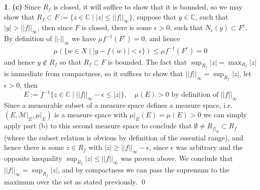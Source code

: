 \documentclass[11pt]{article}
\theoremstyle{definition}
\newtheorem{pb}{}
\newcommand{\set}[1]{\{#1\}}
\newcommand{\abs}[1]{\left\vert#1\right\vert}
\newcommand{\norm}[1]{\lvert\lvert#1\rvert\rvert}
\begin{document}
\begin{pb}
        \textbf{(c)} Since \(R_f\) is closed, it will suffice to show that it is bounded, so we may show that \(R_f \subset F := \set{z \in \mathbb{C} \mid \abs{z} \leq \norm{f}_\infty}\), suppose that \(y \in \mathbb{C}\), such that \(\abs{y} > \norm{f}_\infty\), then since \(F\) is closed, there is some \(\epsilon > 0\), such that \(N_\epsilon(y) \subset F^c\). By definition of \(\norm{\cdot}_\infty\) we have \(\mu f^{-1}(F^c) = 0\), and hence
        \begin{align*}
            \mu(\set{w \in X \mid \abs{y - f(w)} < \epsilon}) \leq \mu f^{-1}(F^c) = 0
        \end{align*}
        and hence \(y \not \in R_f\) so that \(R_f \subset F\) is bounded. The fact that \(\sup_{R_f}\abs{z} = \max_{R_f}\abs{z}\) is immediate from compactness, so it suffices to show that \(\norm{f}_\infty = \sup_{R_f}\abs{z}\), let \(\epsilon > 0\), then 
        \[E := f^{-1}\set{z \in \mathbb{C} \mid \norm{f}_\infty - \epsilon \leq \abs{z}}, \quad \mu(E) > 0 \text{ by definition of }\norm{f}_\infty\]
        Since a measurable subset of a measure space defines a measure space, i.e. \((E, \mathcal{M}\vert_E, \mu\vert_E)\) is a measure space with \(\mu\vert_E(E) = \mu(E) > 0\) we can simply apply part (b) to this second measure space to conclude that \(\emptyset \neq R_{f\vert_E} \subset R_f\) (where the subset relation is obvious by definition of the essential range), and hence there is some \(z \in R_f\) with \(\abs{z} \geq \norm{f}_\infty - \epsilon\), since \(\epsilon\) was arbitrary and the opposite inequality \(\sup_{R_f}\abs{z} \leq \norm{f}_\infty\) was proven above. We conclude that \(\norm{f}_\infty = \sup_{R_f}\abs{z}\), and by compactness we can pass the supremum to the maximum over the set as stated previously. \qed
    \end{pb}
\end{document}

